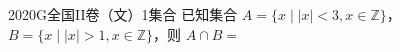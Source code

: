 
\begin{problem}{2020}{G}{全国II卷（文）}{1}{集合}
已知集合 $ A=\{x\mid |x|<3,x\in\mathbb{Z}\} $，$ B=\{x\mid |x|>1,x\in\mathbb{Z}\} $，则 $ A\cap B= $
\begin{choices}
\choice{{$\varnothing$}}
\end{choices}
\end{problem}

\begin{answer}

\end{answer}

\begin{solutions}

\end{solutions}